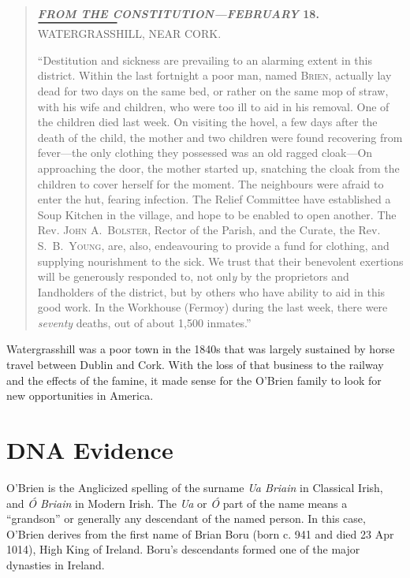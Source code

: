 \begin{quote}
\begin{center}
	\textbf{\textit{FROM THE CONSTITUTION---FEBRUARY} 18.}
	$\vcenter{\hbox{\rule{1in}{1pt}}}$\\
	WATERGRASSHILL, NEAR CORK.
\end{center}
	``Destitution and sickness are prevailing to an alarming extent in this district. Within the last fortnight a poor man, named \textsc{Brien}, actually lay dead for two days on the same bed, or rather on the same mop of straw, with his wife and children, who were too ill to aid in his removal. One of the children died last week. On visiting the hovel, a few days after the death of the child, the mother and two children were found recovering from fever---the only clothing they possessed was an old ragged cloak---On approaching the door, the mother started up, snatching the cloak from the children to cover herself for the moment. The neighbours were afraid to enter the hut, fearing infection. The Relief Committee have established a Soup Kitchen in the village, and hope to be enabled to open another. The Rev. \textsc{John A.\ Bolster}, Rector of the Parish, and the Curate, the Rev. \textsc{S.\ B.\ Young}, are, also, endeavouring to provide a fund for clothing, and supplying nourishment to the sick. We trust that their benevolent exertions will be generously responded to, not onl\textit{y} by the proprietors and Iandholders of the district, but by others who have ability to aid in this good work. In the Workhouse (Fermoy) during the last week, there were \textit{seventy} deaths, out of about 1,500 inmates.''\cite{FamineRelief}
\end{quote}

Watergrasshill was a poor town in the 1840s that was largely sustained by horse travel between Dublin and Cork. With the loss of that business to the railway and the effects of the famine, it made sense for the O'Brien family to look for new opportunities in America.

\section*{DNA Evidence}

O'Brien is the Anglicized spelling of the surname \textit{Ua Briain} in Classical Irish, and \textit{\'{O} Briain} in Modern Irish. The \textit{Ua} or \textit{\'{O}} part of the name means a ``grandson'' or generally any descendant of the named person. In this case, O'Brien derives from the first name of Brian Boru (born c. 941 and died 23 Apr 1014), High King of Ireland. Boru's descendants formed one of the major dynasties in Ireland.\cite{BoruHistorical}

